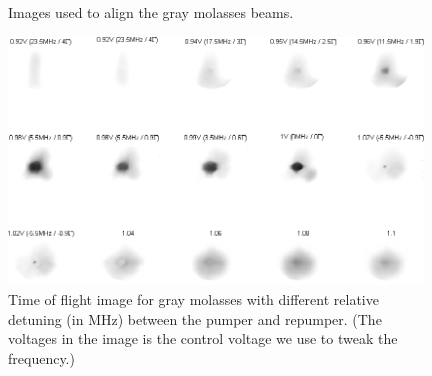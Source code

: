 \begin{figure}
  \begin{center}
  \end{center}
  \caption{Images used to align the gray molasses beams.}
  \label{exp:gm-align}
\end{figure}
\begin{figure}
  \begin{center}
    \includegraphics[width=11cm]{gm-ddet.png}
  \end{center}
  \caption{Time of flight image for gray molasses with different relative detuning (in MHz) between the pumper and repumper. (The voltages in the image is the control voltage we use to tweak the frequency.)}
  \label{exp:gm-ddet}
\end{figure}
